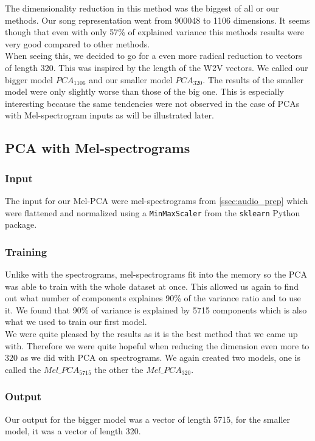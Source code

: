 The dimensionality reduction in this method was the biggest of all or our methods. Our song representation went from 900048 to 1106 dimensions. It seems though that even with only 57\% of explained variance this methods results were very good compared to other methods. \\
When seeing this, we decided to go for a even more radical reduction to vectors of length 320. This was inspired by the length of the W2V vectors. We called our bigger model $PCA_{1106}$ and our smaller model $PCA_{320}. $ The results of the smaller model were only slightly worse than those of the big one. This is especially interesting because the same tendencies were not observed in the case of PCAs with Mel-spectrogram inputs as will be illustrated later.

\subsection{PCA with Mel-spectrograms}
\subsubsection{Input}
The input for our Mel-PCA were mel-spectrograms from \ref{ssec:audio_prep} which were flattened and normalized using a \texttt{MinMaxScaler} from the \texttt{sklearn} Python package.

\subsubsection{Training}
Unlike with the spectrograms, mel-spectrograms fit into the memory so the PCA was able to train with the whole dataset at once. This allowed us again to find out what number of components explaines 90\% of the variance ratio and to use it. We found that 90\% of variance is explained by 5715 components which is also what we used to train our first model. \\
We were quite pleased by the results as it is the best method that we came up with. Therefore we were quite hopeful when reducing the dimension even more to 320 as we did with PCA on spectrograms. We again created two models, one is called the $Mel\_PCA_{5715}$ the other the $Mel\_PCA_{320}$. 

\subsubsection{Output}
Our output for the bigger model was a vector of length 5715, for the smaller model, it was a vector of length 320.

